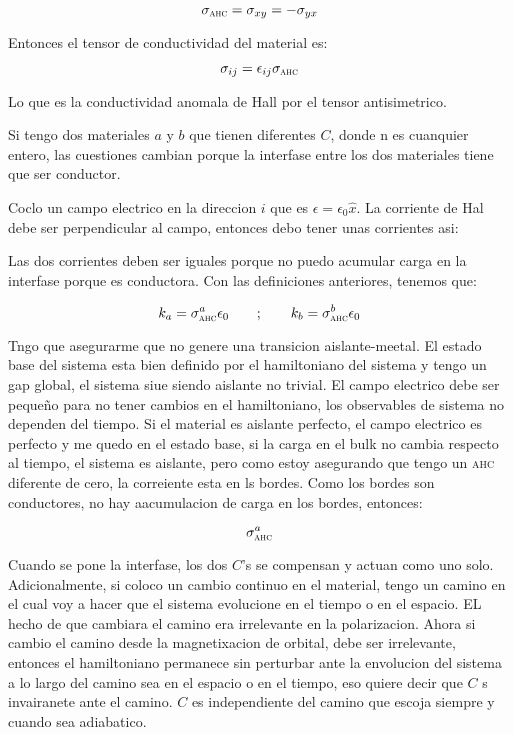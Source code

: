 \documentclass[11pt,fleqn]{book}
\begin{document}
\begin{equation}
    \sigma_{\textsc{ahc}}=\sigma_{xy}=-\sigma_{yx}
\end{equation}

Entonces el tensor de conductividad del material es:

\begin{equation}
    \sigma_{ij}=\epsilon_{ij}\sigma_{\textsc{ahc}}
\end{equation}

Lo que es la conductividad anomala de Hall por el tensor antisimetrico.

Si tengo dos materiales $a$ y $b$ que tienen diferentes $C$, donde n es cuanquier entero, las cuestiones cambian porque  la interfase entre los dos materiales tiene que ser conductor.   



Coclo un campo electrico en la direccion $i$ que es $\epsilon=\epsilon_{0}\hat{x}$. La corriente de Hal debe ser perpendicular al campo, entonces debo tener unas corrientes asi:


Las dos corrientes deben ser iguales porque no puedo acumular carga en la interfase porque es conductora. Con las definiciones anteriores, tenemos que:

\begin{equation}
    k_{a}=\sigma_{\textsc{ahc}}^{a}\epsilon_{0}\qquad;\qquad k_{b}=\sigma_{\textsc{ahc}}^{b}\epsilon_{0}
\end{equation}

Tngo que asegurarme que no genere una transicion aislante-meetal. El estado base del sistema esta bien definido por el hamiltoniano del sistema y tengo un gap global, el sistema siue siendo aislante no trivial. El campo electrico debe ser pequeño para no tener cambios en el hamiltoniano, los observables de sistema no dependen del tiempo. Si el material es aislante perfecto, el campo electrico es perfecto y me quedo en el estado base, si la carga en el bulk no cambia respecto al tiempo, el sistema es aislante, pero como estoy asegurando que  tengo un \textsc{ahc} diferente de cero, la correiente esta en ls bordes. Como los bordes son conductores, no hay aacumulacion de carga en los bordes, entonces:

\begin{equation}
    \sigma_{\textsc{ahc}}^{a}
\end{equation}


Cuando se pone la interfase, los dos $C$'s se compensan y actuan como uno solo. Adicionalmente, si coloco un cambio continuo en el material, tengo un camino en el cual voy a hacer que el sistema evolucione en el tiempo o en el espacio. EL hecho de que cambiara el camino era irrelevante en la polarizacion. Ahora si cambio el camino desde la magnetixacion de orbital, debe ser irrelevante, entonces el hamiltoniano permanece sin perturbar ante la envolucion del sistema a lo largo del camino sea en el espacio o en el tiempo, eso quiere decir que $C$ s invairanete ante el camino. $C$ es independiente del camino que escoja siempre y cuando sea adiabatico. 
\end{document}
